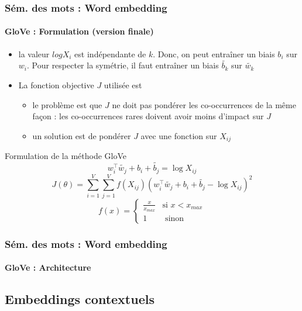 \documentclass[xcolor=table]{beamer}
\begin{document}
\begin{frame}
\frametitle{Sém. des mots : Word embedding}
\framesubtitle{GloVe : Formulation (version finale)}
	
\begin{itemize}
	\item la valeur $log X_i$ est indépendante de $k$. Donc, on peut entraîner un biais $b_i$ sur $w_i$. Pour respecter la symétrie, il faut entraîner un biais $\tilde{b_k}$ sur $\tilde{w_k}$ 
	\item La fonction objective $J$ utilisée est 
	\begin{itemize}
		\item le problème est que $J$ ne doit pas pondérer les co-occurrences de la même façon : les co-occurrences rares doivent avoir moins d'impact sur $J$
		\item un solution est de pondérer $J$ avec une fonction sur $X_{ij}$
	\end{itemize}
\end{itemize}

\vspace{-6pt}
\begin{block}{Formulation de la méthode GloVe}\vspace{-6pt}
	\[w_i^\top \tilde{w_j} + b_i + \tilde{b_j} = \log X_{ij} \]
	\[J(\theta) = \sum_{i=1}^{V} \sum_{j=1}^{V} f(X_{ij}) (w_i^\top \tilde{w_j} + b_i + \tilde{b_j} - \log X_{ij})^2\]
	\vspace{-12pt}\[f(x) = \begin{cases}
	\frac{x}{x_{max}} & \text{si } x < x_{max} \\
	1 & \text{ sinon}
	\end{cases}\]
\vspace{-6pt}\end{block}
	
\end{frame}

\begin{frame}
\frametitle{Sém. des mots : Word embedding}
\framesubtitle{GloVe : Architecture}
	
\begin{center}
\end{center}
	
\end{frame}

\subsection{Embeddings contextuels}
\end{document}
